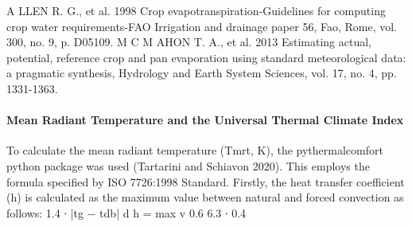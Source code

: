 \documentclass[final,3p,times,authoryear]{elsarticle}
\begin{document}
A LLEN R. G., et al. 1998 Crop evapotranspiration-Guidelines for computing crop water
requirements-FAO Irrigation and drainage paper 56, Fao, Rome, vol. 300, no. 9, p.
D05109.
M C M AHON T. A., et al. 2013 Estimating actual, potential, reference crop and pan evaporation
using standard meteorological data: a pragmatic synthesis, Hydrology and Earth System
Sciences, vol. 17, no. 4, pp. 1331-1363.

\paragraph{Mean Radiant Temperature and the Universal Thermal Climate Index}\label{sec:appendix7.4.4}

To calculate the mean radiant temperature (\gls{Tmrt}, K), the pythermalcomfort python
package was used (Tartarini and Schiavon 2020). This employs the formula specified by
ISO 7726:1998 Standard. Firstly, the heat transfer coefficient (h) is calculated as the
maximum value between natural and forced convection as follows:
1.4 ∙ |tg − tdb|
d
h = max
v 0.6
6.3 ∙ 0.4
\end{document}
